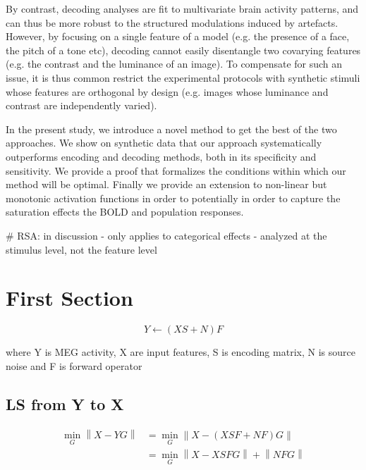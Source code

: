\documentclass[runningheads]{llncs}
\begin{document}
By contrast, decoding analyses are fit to multivariate brain activity patterns, and can thus be more robust to the structured modulations induced by artefacts. However, by focusing on a single feature of a model (e.g. the presence of a face, the pitch of a tone etc), decoding cannot easily disentangle two covarying features (e.g. the contrast and the luminance of an image). To compensate for such an issue, it is thus common restrict the experimental protocols with synthetic stimuli whose features are orthogonal by design (e.g. images whose luminance and contrast are independently varied).

In the present study, we introduce a novel method to get the best of the two approaches. We show on synthetic data that our approach systematically outperforms encoding and decoding methods, both in its specificity and sensitivity. We provide a proof that formalizes the conditions within which our method will be optimal. Finally we provide an extension to non-linear but monotonic activation functions in order to potentially in order to capture the saturation effects the BOLD and population responses.


# RSA: in discussion
- only applies to categorical effects
- analyzed at the stimulus level, not the feature level

\section{First Section}

\begin{equation}
Y\leftarrow (XS+N)F
\end{equation}

where Y is MEG activity, X are input features, S is encoding matrix, N is source noise and F is forward operator

\subsection{LS from Y to X}

\begin{equation}
\begin{aligned}
\min_G \left \| X-YG \right \| &= \min_G \left \| X - (XSF+NF)G\right\| \\
&{}= \min_G \left \| X - XSFG\right\|  + \left \| NFG \right \| \\
\end{aligned}
\end{equation}
\end{document}
